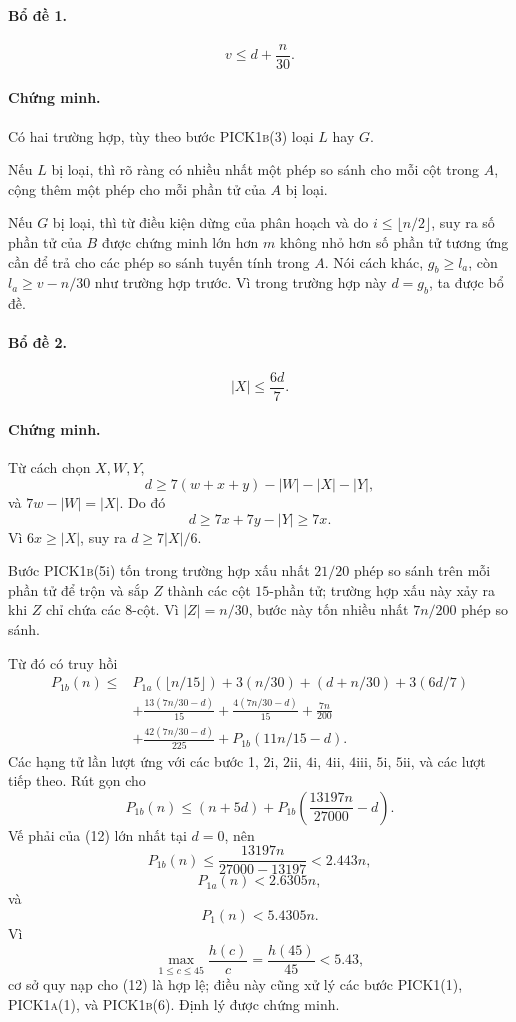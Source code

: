 \documentclass[11pt]{article}
\newcommand{\PICKone}{\textsc{PICK1}}
\newcommand{\PICKonea}{\textsc{PICK1a}}
\newcommand{\PICKoneb}{\textsc{PICK1b}}
\begin{document}
\paragraph{Bổ đề 1.}
\[
  v\le d+\frac{n}{30}.
  \tag{10}
\]

\paragraph{Chứng minh.}
Có hai trường hợp, tùy theo bước \PICKoneb(3) loại \(L\) hay \(G\).

Nếu \(L\) bị loại, thì rõ ràng có nhiều nhất một phép so sánh cho mỗi cột
trong \(A\), cộng thêm một phép cho mỗi phần tử của \(A\) bị loại.

Nếu \(G\) bị loại, thì từ điều kiện dừng của phân hoạch và do \(i\le
\lfloor n/2\rfloor\), suy ra số phần tử của \(B\) được chứng minh lớn hơn
\(m\) không nhỏ hơn số phần tử tương ứng cần để trả cho các phép so sánh tuyến
tính trong \(A\). Nói cách khác, \(g_b\ge l_a\), còn \(l_a\ge v-n/30\) như
trường hợp trước. Vì trong trường hợp này \(d=g_b\), ta được bổ đề.

\paragraph{Bổ đề 2.}
\[
  |X|\le \frac{6d}{7}.
  \tag{11}
\]

\paragraph{Chứng minh.}
Từ cách chọn \(X,W,Y\),
\[
  d\ge 7(w+x+y)-|W|-|X|-|Y|,
\]
và \(7w-|W|=|X|\). Do đó
\[
  d\ge 7x+7y-|Y|\ge 7x.
\]
Vì \(6x\ge |X|\), suy ra \(d\ge 7|X|/6\).

Bước \PICKoneb{}(5i) tốn trong trường hợp xấu nhất \(21/20\) phép so
sánh trên mỗi phần tử để trộn và sắp \(Z\) thành các cột \(15\)-phần tử; trường
hợp xấu này xảy ra khi \(Z\) chỉ chứa các \(8\)-cột. Vì \(|Z|=n/30\), bước này
tốn nhiều nhất \(7n/200\) phép so sánh.

Từ đó có truy hồi
\[
\begin{aligned}
P_{1b}(n)\le{}&
P_{1a}(\lfloor n/15\rfloor)
 +3(n/30)
 +(d+n/30)
 +3(6d/7)\\
&+\frac{13(7n/30-d)}{15}
 +\frac{4(7n/30-d)}{15}
 +\frac{7n}{200}\\
&+\frac{42(7n/30-d)}{225}
 +P_{1b}(11n/15-d).
\end{aligned}
\]
Các hạng tử lần lượt ứng với các bước 1, \(2\mathrm{i}\), \(2\mathrm{ii}\),
\(4\mathrm{i}\), \(4\mathrm{ii}\), \(4\mathrm{iii}\), \(5\mathrm{i}\),
\(5\mathrm{ii}\), và các lượt tiếp theo. Rút gọn cho
\[
  P_{1b}(n)\le (n+5d)
  +P_{1b}\!\left(\frac{13197n}{27000}-d\right).
  \tag{12}
\]
Vế phải của (12) lớn nhất tại \(d=0\), nên
\[
  P_{1b}(n)\le \frac{13197n}{27000-13197}<2.443n,
  \tag{13}
\]
\[
  P_{1a}(n)<2.6305n,
  \tag{14}
\]
và
\[
  P_1(n)<5.4305n.
  \tag{15}
\]
Vì
\[
  \max_{1\le c\le 45}\frac{h(c)}{c}
  =\frac{h(45)}{45}<5.43,
  \tag{16}
\]
cơ sở quy nạp cho (12) là hợp lệ; điều này cũng xử lý các bước
\PICKone(1), \PICKonea(1), và \PICKoneb(6). Định lý được chứng minh.
\end{document}
